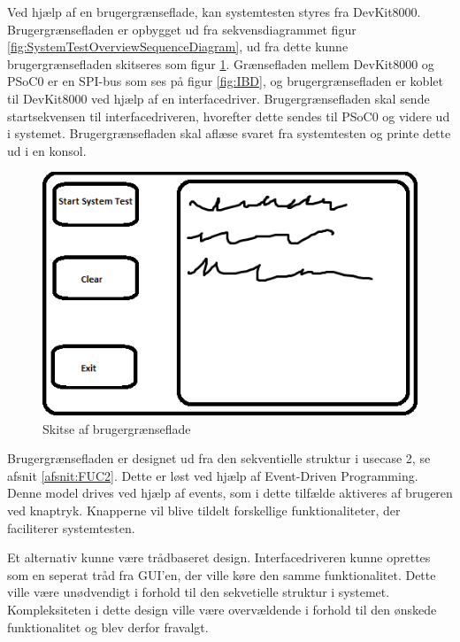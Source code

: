Ved hjælp af en brugergrænseflade, kan systemtesten styres fra DevKit8000.
Brugergrænsefladen er opbygget ud fra sekvensdiagrammet figur \ref{fig:SystemTestOverviewSequenceDiagram},
ud fra dette kunne brugergrænsefladen skitseres som figur \ref{fig:GUISkitse}.
Grænsefladen mellem DevKit8000 og PSoC0 er en SPI-bus som ses på figur \ref{fig:IBD}, og brugergrænsefladen er koblet til DevKit8000 ved hjælp af en interfacedriver.
Brugergrænsefladen skal sende startsekvensen til interfacedriveren, hvorefter dette sendes til PSoC0 og videre ud i systemet.
Brugergrænsefladen skal aflæse svaret fra systemtesten og printe dette ud i en konsol.

\begin{figure}[H]
	\centering
	\includegraphics[width=\textwidth] {Systemarkitektur/images/GUISkitse}
	\caption{Skitse af brugergrænseflade}
	\label{fig:GUISkitse}
\end{figure}


Brugergrænsefladen er designet ud fra den sekventielle struktur i usecase 2, se afsnit \ref{afsnit:FUC2}. Dette er løst ved hjælp af Event-Driven Programming.
Denne model drives ved hjælp af events, som i dette tilfælde aktiveres af brugeren ved knaptryk. Knapperne vil blive tildelt forskellige funktionaliteter, der faciliterer systemtesten.

Et alternativ kunne være trådbaseret design. Interfacedriveren kunne oprettes som en seperat tråd fra GUI'en, der ville køre den samme funktionalitet. Dette ville være unødvendigt i forhold til den sekvetielle struktur i systemet. Kompleksiteten i dette design ville være overvældende i forhold til den ønskede funktionalitet og blev derfor fravalgt.

